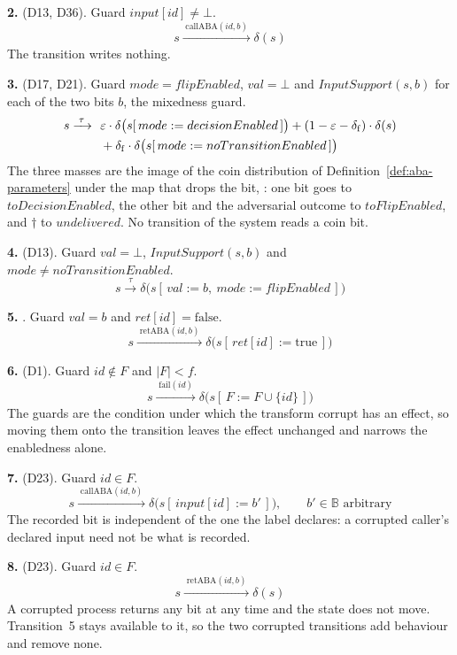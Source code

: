 \noindent\textbf{2.}  (D13, D36).
Guard $input[id] \neq \bot$.
\[ s \xrightarrow{\;\mathrm{callABA}(id,b)\;} \delta(s) \]
The transition writes nothing.

\noindent\textbf{3.}  (D17, D21).
Guard $mode = flipEnabled$, $val = \bot$ and $InputSupport(s,b)$ for each of the two bits $b$, the mixedness guard.
\[ \begin{aligned}
     s \xrightarrow{\;\tau\;}\ \
     &\varepsilon\cdot\delta\bigl(s[\,mode := decisionEnabled\,]\bigr)
     + (1-\varepsilon-\delta_{\mathrm{f}})\cdot\delta(s)\\
     &{}+ \delta_{\mathrm{f}}\cdot\delta\bigl(s[\,mode := noTransitionEnabled\,]\bigr)
   \end{aligned} \]
The three masses are the image of the coin distribution of Definition~\ref{def:aba-parameters} under the map that drops the bit, : one bit goes to $toDecisionEnabled$, the other bit and the adversarial outcome to $toFlipEnabled$, and $\dagger$ to $undelivered$.
No transition of the system reads a coin bit.

\noindent\textbf{4.}  (D13).
Guard $val = \bot$, $InputSupport(s,b)$ and $mode \neq noTransitionEnabled$.
\[ s \xrightarrow{\;\tau\;}
   \delta\bigl(s[\,val := b,\ mode := flipEnabled\,]\bigr) \]

\noindent\textbf{5.} .
Guard $val = b$ and $ret[id] = \mathrm{false}$.
\[ s \xrightarrow{\;\mathrm{retABA}(id,b)\;}
   \delta\bigl(s[\,ret[id] := \mathrm{true}\,]\bigr) \]

\noindent\textbf{6.}  (D1).
Guard $id \notin F$ and $|F| < f$.
\[ s \xrightarrow{\;\mathrm{fail}(id)\;}
   \delta\bigl(s[\,F := F \cup \{id\}\,]\bigr) \]
The guards are the condition under which the transform $\mathrm{corrupt}$ has an effect, so moving them onto the transition leaves the effect unchanged and narrows the enabledness alone.

\noindent\textbf{7.}  (D23).
Guard $id \in F$.
\[ s \xrightarrow{\;\mathrm{callABA}(id,b)\;}
   \delta\bigl(s[\,input[id] := b'\,]\bigr),
   \qquad b' \in \mathbb{B} \text{ arbitrary} \]
The recorded bit is independent of the one the label declares: a corrupted caller's declared input need not be what is recorded.

\noindent\textbf{8.}  (D23).
Guard $id \in F$.
\[ s \xrightarrow{\;\mathrm{retABA}(id,b)\;} \delta(s) \]
A corrupted process returns any bit at any time and the state does not move.
Transition~5 stays available to it, so the two corrupted transitions add behaviour and remove none.

